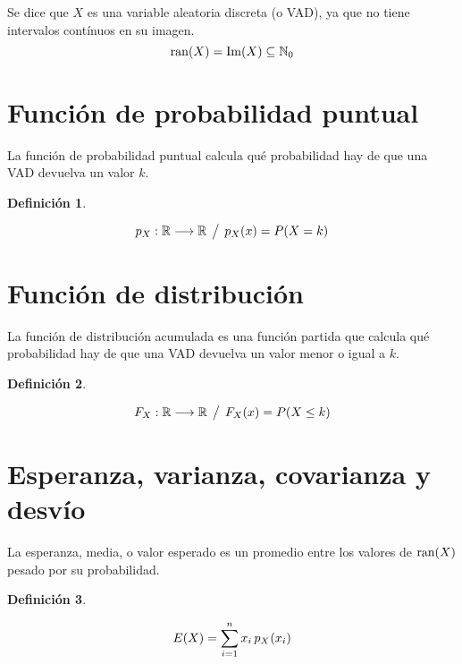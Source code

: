 \documentclass[a5paper,12pt,twoside]{book}
\newtheorem{defn}{{Definición}}[chapter]
\begin{document}
Se dice que $X$ es una variable aleatoria discreta (o VAD), ya que no tiene intervalos contínuos en su imagen.
\begin{equation*}
    \ran(X) = \im(X) \subseteq \setN_0
\end{equation*}


\section{Función de probabilidad puntual}

La función de probabilidad puntual calcula qué probabilidad hay de que una VAD devuelva un valor $k$.

\begin{mdframed}[style=MyFrame1]
    \begin{defn}
    \end{defn}
    \begin{equation*}
        p_X: \setR \longrightarrow \setR \tq p_X(x) = P(X=k)
    \end{equation*}
\end{mdframed}


\section{Función de distribución}

La función de distribución acumulada es una función partida que calcula qué probabilidad hay de que una VAD devuelva un valor menor o igual a $k$.

\begin{mdframed}[style=MyFrame1]
    \begin{defn}
    \end{defn}
    \begin{equation*}
        F_X: \setR \longrightarrow \setR \tq F_X(x) = P(X \leq k)
    \end{equation*}
\end{mdframed}


\section{Esperanza, varianza, covarianza y desvío}

La esperanza, media, o valor esperado es un promedio entre los valores de $\ran(X)$ pesado por su probabilidad.

\begin{mdframed}[style=MyFrame1]
    \begin{defn}
    \end{defn}
    \begin{equation*}
        E(X) = \sum_{i=1}^n x_i \, \fx[p_X]{x_i}
    \end{equation*}
\end{mdframed}
\end{document}

